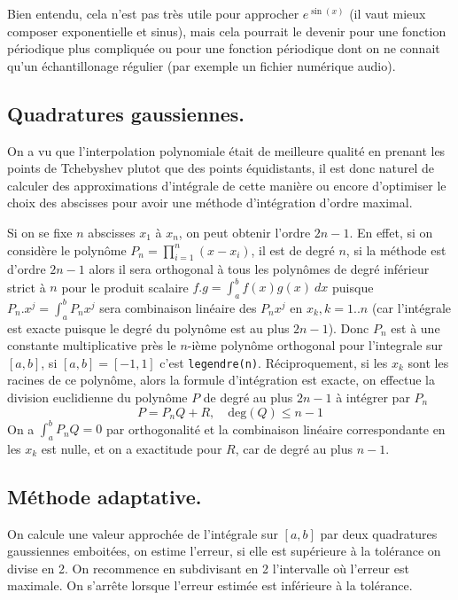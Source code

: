 \documentclass[a4paper,11pt]{article}
\begin{document}
Bien entendu, cela n'est pas tr\`es utile pour approcher $e^{\sin(x)}$
(il vaut mieux composer exponentielle et sinus), 
mais cela pourrait le devenir pour une
fonction p\'eriodique plus compliqu\'ee ou pour une fonction
p\'eriodique dont on ne connait qu'un \'echantillonage r\'egulier
(par exemple un fichier num\'erique audio).

\subsection{Quadratures gaussiennes.}
On a vu que l'interpolation polynomiale \'etait de meilleure
qualit\'e en prenant les points de Tchebyshev plutot que
des points \'equidistants, il est donc naturel de calculer
des approximations d'int\'egrale de cette mani\`ere
ou encore d'optimiser le choix des abscisses pour avoir
une m\'ethode d'int\'egration d'ordre maximal.

Si on se fixe $n$ abscisses $x_1$ \`a $x_n$, on peut obtenir l'ordre
$2n-1$. En effet, si on consid\`ere le polyn\^ome $P_n=\prod_{i=1}^n (x-x_i)$,
il est de degr\'e $n$, si la m\'ethode est d'ordre $2n-1$ alors
il sera orthogonal \`a tous les polyn\^omes de degr\'e inf\'erieur
strict \`a $n$ pour le produit scalaire $f.g=\int_a^b f(x) g(x) \ dx$
puisque $P_n.x^j=\int_a^b P_n x^j $ sera combinaison lin\'eaire des
$P_n x^j$ en $x_k, k=1..n$ (car l'int\'egrale est exacte puisque le degr\'e
du polyn\^ome est au plus $2n-1$). Donc $P_n$ est \`a une constante
multiplicative pr\`es le $n$-i\`eme polyn\^ome orthogonal pour
l'integrale sur $[a,b]$, si $[a,b]=[-1,1]$ c'est \verb|legendre(n)|.
R\'eciproquement, si les $x_k$ sont les racines de ce polyn\^ome,
alors la formule d'int\'egration est exacte, on effectue la division
euclidienne du polyn\^ome $P$ de degr\'e au plus $2n-1$ \`a
int\'egrer par $P_n$
$$ P= P_n Q + R , \quad \mbox{deg}(Q) \leq n-1 $$
On a $\int_a^b P_n Q=0$ par orthogonalit\'e et la combinaison
lin\'eaire correspondante en les $x_k$ est nulle, et on a exactitude
pour $R$, car de degr\'e au plus $n-1$.


\subsection{M\'ethode adaptative.}
On calcule une valeur approch\'ee de l'int\'egrale sur $[a,b]$ par
deux quadratures gaussiennes emboit\'ees, on estime l'erreur,
si elle est sup\'erieure \`a la tol\'erance on divise en 2. On
recommence en subdivisant en 2 l'intervalle o\`u l'erreur est
maximale. On s'arr\^ete lorsque l'erreur estim\'ee est inf\'erieure
\`a la tol\'erance.
\end{document}
